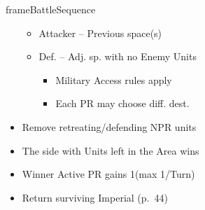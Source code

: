 \documentclass[10pt]{article}
\newlength{\fhBattleSequence} \setlength\fhBattleSequence{50\baselineskip}
\begin{document}
\begin{dynamiccontents*}{frameBattleSequence}
\begin{eubox}{\fhBattleSequence}
\begin{multicols}{2}
\begin{itemize}
			\begin{itemize}
				\item Attacker -- Previous space(s)
				\item Def. -- Adj. sp. with no Enemy Units
				\begin{itemize}
					\item Military Access rules apply
					\item Each PR may choose diff. dest.
				\end{itemize}
			\end{itemize}
			\item Remove retreating/defending NPR units
		\end{itemize}
		\begin{itemize}
			\item The side with Units left in the Area wins
			\item Winner Active PR gains 1\milpower (max 1/Turn)
			\item Return surviving Imperial \manpower (p.~44)
		\end{itemize}
	\end{multicols}
\end{eubox}\end{dynamiccontents*}
\end{document}

